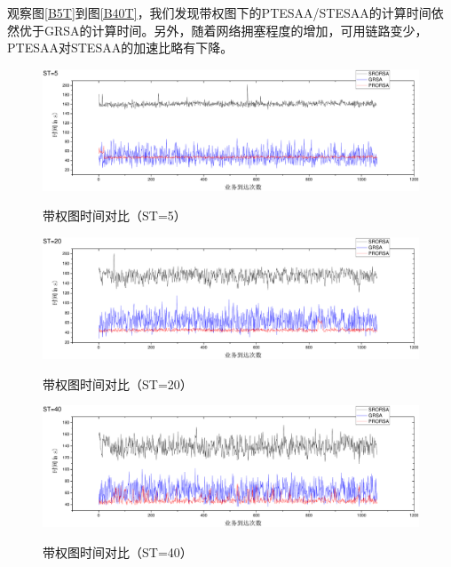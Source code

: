 观察图\ref{B5T}到图\ref{B40T}，我们发现带权图下的PTESAA/STESAA的计算时间依然优于GRSA的计算时间。另外，随着网络拥塞程度的增加，可用链路变少，PTESAA对STESAA的加速比略有下降。
\begin{figure}
\setlength{\belowcaptionskip}{-0.5cm}
\begin{center}
{\includegraphics[width=1 \textwidth]{figures/H5T.pdf}}
\end{center}
\caption{{\footnotesize{带权图时间对比（ST=5）}}}
\label{H5T}
\end{figure}
\begin{figure}
\setlength{\belowcaptionskip}{-0.5cm}
\begin{center}
{\includegraphics[width=1 \textwidth]{figures/H20T.pdf}}
\end{center}
\caption{{\footnotesize{带权图时间对比（ST=20）}}}
\label{H20T}
\end{figure}
\begin{figure}
\setlength{\belowcaptionskip}{-0.5cm}
\begin{center}
{\includegraphics[width=1 \textwidth]{figures/H40T.pdf}}
\end{center}
\caption{{\footnotesize{带权图时间对比（ST=40）}}}
\label{H40T}
\end{figure}


